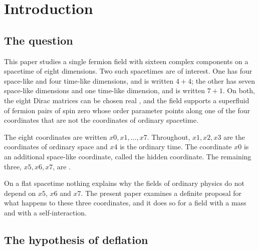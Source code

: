 \section{Introduction}
\label{sec:intro}

\subsection{The question}

This paper studies a single fermion field with sixteen complex components on a spacetime of eight
dimensions. Two such spacetimes are of interest. One has four space-like and four time-like
dimensions, and is written $4+4$; the other has seven space-like dimensions and one time-like
dimension, and is written $7+1$. On both, the eight Dirac matrices can be chosen real
\cite{Nash1984,Nash1990,Nash2010}, and the field
supports a superfluid of fermion pairs of spin zero whose order parameter points along one of the
four coordinates that are not the coordinates of ordinary spacetime. 

The eight coordinates are written $x0,x1,\dots,x7$. Throughout, $x1,x2,x3$ are the coordinates of
ordinary space and $x4$ is the ordinary time. The coordinate $x0$ is an additional space-like
coordinate, called the hidden coordinate. The remaining three, $x5,x6,x7$, are
.

On a flat spacetime nothing explains why the fields of ordinary physics do not depend on $x5$, $x6$
and $x7$.  The present paper examines a definite proposal for what happens to
these three coordinates, and it does so for a field with a mass and with a self-interaction.

\subsection{The hypothesis of deflation}

